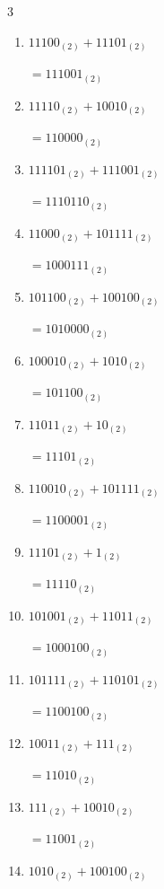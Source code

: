 \begin{multicols}{3}
\begin{enumerate}
  \item $11100_{(2)} + 11101_{(2)}$

        $=111001_{(2)}$

\columnbreak %

  \item $11110_{(2)} + 10010_{(2)}$

        $=110000_{(2)}$

  \item $111101_{(2)} + 111001_{(2)}$

        $=1110110_{(2)}$

  \item $11000_{(2)} + 101111_{(2)}$

        $=1000111_{(2)}$

  \item $101100_{(2)} + 100100_{(2)}$

        $=1010000_{(2)}$

  \item $100010_{(2)} + 1010_{(2)}$

        $=101100_{(2)}$

  \item $11011_{(2)} + 10_{(2)}$

        $=11101_{(2)}$

  \item $110010_{(2)} + 101111_{(2)}$

        $=1100001_{(2)}$

  \item $11101_{(2)} + 1_{(2)}$

        $=11110_{(2)}$

  \item $101001_{(2)} + 11011_{(2)}$

        $=1000100_{(2)}$

  \item $101111_{(2)} + 110101_{(2)}$

        $=1100100_{(2)}$

\columnbreak %

  \item $10011_{(2)} + 111_{(2)}$

        $=11010_{(2)}$

  \item $111_{(2)} + 10010_{(2)}$

        $=11001_{(2)}$

  \item $1010_{(2)} + 100100_{(2)}$


\end{enumerate}
\end{multicols}
